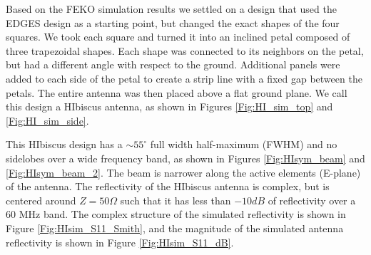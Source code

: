 Based on the FEKO simulation results we settled on a design that used the EDGES design as a starting point, but changed the exact shapes of the four squares. We took each square and turned it into an inclined petal composed of three trapezoidal shapes. Each shape was connected to its neighbors on the petal, but had a different angle with respect to the ground. Additional panels were added to each side of the petal to create a strip line with a fixed gap between the petals. The entire antenna was then placed above a flat ground plane. We call this design a HIbiscus antenna, as shown in Figures \ref{Fig:HI_sim_top} and \ref{Fig:HI_sim_side}. 

This HIbiscus design has a $\sim 55^\circ$ full width half-maximum (FWHM) and no sidelobes over a wide frequency band, as shown in Figures \ref{Fig:HIsym_beam} and \ref{Fig:HIsym_beam_2}. The beam is narrower along the active elements (E-plane) of the antenna. The reflectivity of the HIbiscus antenna is complex, but is centered around $Z= 50 \Omega$ such that it has less than $-10 dB$ of reflectivity over a 60 MHz band. The complex structure of the simulated reflectivity is shown in Figure \ref{Fig:HIsim_S11_Smith}, and the magnitude of the simulated antenna reflectivity is shown in Figure \ref{Fig:HIsim_S11_dB}. 

